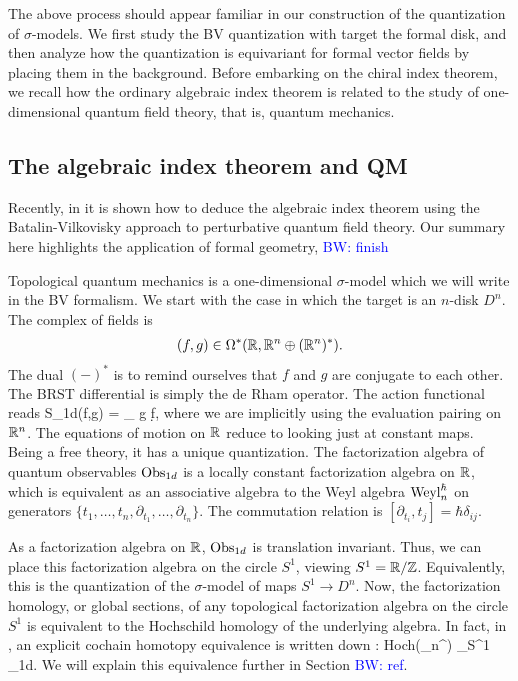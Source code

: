 \documentclass[10pt]{amsart}
\def\brian{\textcolor{blue}{BW: }\textcolor{blue}}
\begin{document}
The above process should appear familiar in our construction of the quantization of $\sigma$-models. 
We first study the BV quantization with target the formal disk, and then analyze how the quantization is equivariant for formal vector fields by placing them in the background.
Before embarking on the chiral index theorem, we recall how the ordinary algebraic index theorem is related to the study of one-dimensional quantum field theory, that is, quantum mechanics.

\subsection{The algebraic index theorem and QM}

Recently, in \cite{GLL} it is shown how to deduce the algebraic index theorem using the Batalin-Vilkovisky approach to perturbative quantum field theory. 
Our summary here highlights the application of formal geometry, \brian{finish}

Topological quantum mechanics is a one-dimensional $\sigma$-model which we will write in the BV formalism.
We start with the case in which the target is an $n$-disk $D^n$. 
The complex of fields is
\begin{align*}
(f,g) \in \Omega^*(\mathbb R, \mathbb R^n \oplus (\mathbb R^n)^*) .
\end{align*}
The dual $(-)^*$ is to remind ourselves that $f$ and $g$ are conjugate to each other.
The BRST differential is simply the de Rham operator. 
The action functional reads
\ben
S_{1d}(f,g) = \int_{\RR} g \d f,
\een
where we are implicitly using the evaluation pairing on $\mathbb R^n$. 
The equations of motion on $\mathbb R$ reduce to looking just at constant maps. 
Being a free theory, it has a unique quantization. 
The factorization algebra of quantum observables ${\rm Obs}_{1d}$ is a locally constant factorization algebra on $\mathbb R$, which is equivalent as an associative algebra to the Weyl algebra ${\rm Weyl}^\hbar_n$ on generators $\{t_1,\ldots,t_n, \partial_{t_1}, \ldots, \partial_{t_n}\}$. 
The commutation relation is $[\partial_{t_i},t_j] = \hbar \delta_{ij}$. 

As a factorization algebra on $\mathbb R$, ${\rm Obs}_{1d}$ is translation invariant. 
Thus, we can place this factorization algebra on the circle $S^1$, viewing $S^1 = \mathbb R / \mathbb Z$. 
Equivalently, this is the quantization of the $\sigma$-model of maps $S^1 \to D^n$. 
Now, the factorization homology, or global sections, of any topological factorization algebra on the circle $S^1$ is equivalent to the Hochschild homology of the underlying algebra. 
In fact, in \cite{GLL}, an explicit cochain homotopy equivalence is written down
\ben
\Phi : {\rm Hoch}(\Weyl_n^\hbar) \xto{\simeq} \int_{S^1} \Obs_{1d}.
\een
We will explain this equivalence further in Section \brian{ref}.
\end{document}
